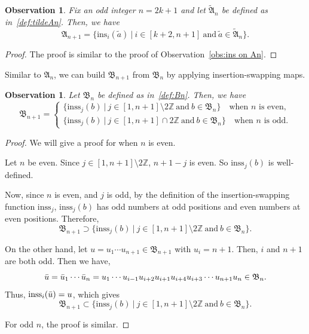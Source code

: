 \documentclass[12pt]{amsart}
\newtheorem{obs}[thm]{Observation}
\theoremstyle{definition}
\numberwithin{equation}{section}
\newcommand{\ins}[1]{\mathrm{ins}_{#1}}
\newcommand{\inss}[1]{\mathrm{inss}_{#1}}
\begin{document}
\begin{obs}\label{obs:ins on tildeAn}
    Fix an odd integer $n=2k+1$ and let $\tilde{\mathfrak A}_n$ be defined as in~\eqref{def:tildeAn}. Then, we have \begin{equation*}
        \mathfrak A_{n+1} = \{\ins {i}(\tilde{a}) \ | \ i\in[k+2,n+1] \ \text{and} \ \tilde{a}\in \tilde{\mathfrak A}_n \}.
    \end{equation*}
\end{obs}
\begin{proof}
    The proof is similar to the proof of Observation~\ref{obs:ins on An}.
\end{proof}

Similar to $\mathfrak A_n$, we can build $\mathfrak B_{n+1}$ from $\mathfrak B_{n}$ by applying insertion-swapping maps.

\begin{obs}\label{obs:ins on Bn}
    Let $\mathfrak B_n$ be defined as in~\eqref{def:Bn}. Then, we have \begin{equation*}
        \mathfrak B_{n+1} =\begin{cases}
            \{\inss{j}(b) \ | \ j\in[1,n+1]\setminus 2\mathbb{Z} \ \text{and} \ b\in \mathfrak B_n \} \quad\text{when $n$ is even,}\\
            \{\inss{j}(b) \ | \ j\in[1,n+1]\cap 2\mathbb{Z} \ \text{and} \ b\in \mathfrak B_n \} \quad \text{when $n$ is odd}.
        \end{cases}
    \end{equation*}
\end{obs}
\begin{proof}
    We will give a proof for when $n$ is even.

    Let $n$ be even. Since $j\in [1,n+1] \setminus 2\mathbb{Z}$, $n+1-j$ is even. So $\inss j(b)$ is well-defined.

    Now, since $n$ is even, and $j$ is odd, by the definition of the insertion-swapping function $\inss j$, $\inss j(b)$ has odd numbers at odd positions and even numbers at even positions. Therefore, \begin{equation*}
        \mathfrak B_{n+1} \supset \{\inss {j}(b) \ | \ j\in[1,n+1]\setminus 2\mathbb{Z} \ \text{and} \ b\in \mathfrak B_n \}.
    \end{equation*}

    On the other hand, let $u = u_1\cdots u_{n+1} \in \mathfrak B_{n+1}$ with $u_i = n+1$. Then, $i$ and $n+1$ are both odd. Then we have, \begin{equation*}
        \Bar{u} = \Bar{u}_1\cdots \Bar{u}_n=u_1\cdots u_{i-1} u_{i+2} u_{i+1} u_{i+4}u_{i+3} \cdots u_{n+1}u_{n} \in \mathfrak B_n.
    \end{equation*} Thus, $\inss {i}(\Bar{u}) = u $, which gives \begin{equation*}
        \mathfrak B_{n+1} \subset \{\inss {j}(b) \ | \ j\in[1,n+1]\setminus 2\mathbb{Z} \ \text{and} \ b\in \mathfrak B_n \}.
    \end{equation*}

For odd $n$, the proof is similar. \end{proof}
\end{document}
